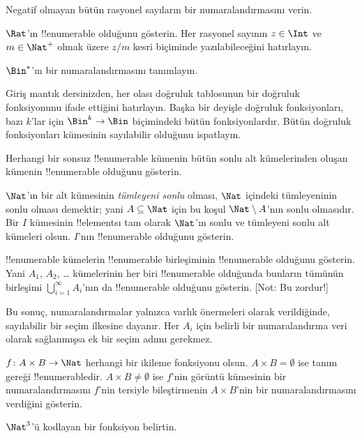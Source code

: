 \begin{prob}
Negatif olmayan bütün rasyonel sayıların bir numaralandırmasını verin.
\end{prob}

\begin{prob}
$\Rat$'ın !!{enumerable} olduğunu gösterin. Her rasyonel sayının $z\in\Int$
ve $m\in\Nat^+$ olmak üzere $z/m$ kesri biçiminde yazılabileceğini hatırlayın.
\end{prob}

\begin{prob}
$\Bin^*$'ın bir numaralandırmasını tanımlayın.
\end{prob}

\begin{prob}
Giriş mantık dersinizden, her olası doğruluk tablosunun bir doğruluk
fonksiyonunu ifade ettiğini hatırlayın. Başka bir deyişle doğruluk
fonksiyonları, bazı $k$'lar için $\Bin^k \to \Bin$ biçimindeki bütün
fonksiyonlardır. Bütün doğruluk fonksiyonları kümesinin sayılabilir olduğunu
ispatlayın.
\end{prob}

\begin{prob}
Herhangi bir sonsuz !!{enumerable} kümenin bütün sonlu alt kümelerinden
oluşan kümenin !!{enumerable} olduğunu gösterin.
\end{prob}

\begin{prob}
$\Nat$'ın bir alt kümesinin \emph{tümleyeni sonlu} olması, $\Nat$ içindeki
tümleyeninin sonlu olması demektir; yani $A\subseteq\Nat$ için bu koşul
$\Nat\setminus A$'nın sonlu olmasıdır. Bir $I$ kümesinin !!{element}s{}ı tam
olarak $\Nat$'ın sonlu ve tümleyeni sonlu alt kümeleri olsun. $I$'nın !!{enumerable}
olduğunu gösterin.
\end{prob}

\begin{prob}
!!{enumerable} kümelerin !!{enumerable} birleşiminin !!{enumerable} olduğunu
gösterin. Yani $A_1$, $A_2$, \dots{} kümelerinin her biri !!{enumerable}
olduğunda bunların tümünün birleşimi $\bigcup_{i=1}^\infty A_i$'nın da
!!{enumerable} olduğunu gösterin. [Not: Bu zordur!]
\end{prob}

\begin{editorial}
Bu sonuç, numaralandırmalar yalnızca varlık önermeleri olarak verildiğinde,
sayılabilir bir seçim ilkesine dayanır. Her $A_i$ için belirli bir
numaralandırma veri olarak sağlanmışsa ek bir seçim adımı gerekmez.
\end{editorial}

\begin{prob}
$f\colon A\times B\to\Nat$ herhangi bir ikileme fonksiyonu olsun.
$A\times B=\emptyset$ ise tanım gereği !!{enumerable}{}dir. $A\times B\neq
\emptyset$ ise $f$'nin görüntü kümesinin bir numaralandırmasını $f$'nin
tersiyle bileştirmenin $A\times B$'nin bir numaralandırmasını verdiğini gösterin.
\end{prob}

\begin{prob}
$\Nat^3$'ü kodlayan bir fonksiyon belirtin.
\end{prob}

